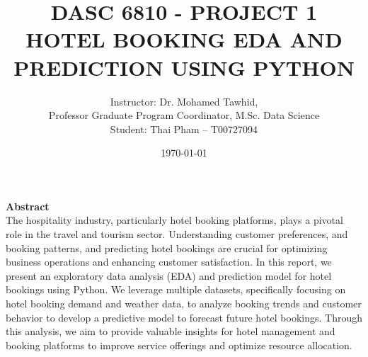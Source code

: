 \documentclass[12pt]{report}
\begin{document}
	\title{DASC 6810 - PROJECT 1\\
		\textbf{HOTEL BOOKING EDA AND PREDICTION USING PYTHON}}
	\author{Instructor: Dr. Mohamed Tawhid, 
		\\
		Professor Graduate Program Coordinator, M.Sc. Data Science
		\\
		Student: Thai Pham – T00727094
	}
	\date{\today}
	\maketitle
\textbf{\large Abstract}
\\
The hospitality industry, particularly hotel booking platforms, plays a pivotal role in the travel and tourism sector. Understanding customer preferences, and booking patterns, and predicting hotel bookings are crucial for optimizing business operations and enhancing customer satisfaction. In this report, we present an exploratory data analysis (EDA) and prediction model for hotel bookings using Python. We leverage multiple datasets, specifically focusing on hotel booking demand and weather data, to analyze booking trends and customer behavior to develop a predictive model to forecast future hotel bookings. Through this analysis, we aim to provide valuable insights for hotel management and booking platforms to improve service offerings and optimize resource allocation. 
\end{document}
